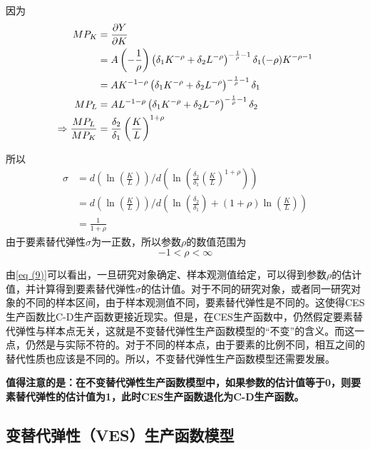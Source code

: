 	因为
	\begin{equation}
		\begin{aligned}
			M P_{K} & = \frac{\partial Y}{\partial K} \\
			& = A\left(-\frac{1}{\rho}\right)\left(\delta_{1} K^{-\rho}+\delta_{2} L^{-\rho}\right)^{-\frac{1}{\rho}-1} \delta_{1}(-\rho) K^{-\rho-1} \\
			& = A K^{-1-\rho}\left(\delta_{1} K^{-\rho}+\delta_{2} L^{-\rho}\right)^{-\frac{1}{\rho}-1} \delta_{1} \\
			M P_{L} & = A L^{-1-\rho}\left(\delta_{1} K^{-\rho}+\delta_{2} L^{-\rho}\right)^{-\frac{1}{\rho}-1} \delta_{2} \\
			\Rightarrow \frac{M P_{L}}{M P_{K}} & = \frac{\delta_{2}}{\delta_{1}}\left(\frac{K}{L}\right)^{1+\rho} \notag
		\end{aligned}
	\end{equation}
	
	所以
	\begin{equation}
		\begin{aligned}
			\sigma & = d\left(\ln \left(\frac{K}{L}\right)\right) \bigg/ d\left(\ln \left(\frac{\delta_{2}}{\delta_{1}}\left(\frac{K}{L}\right)^{1+\rho}\right)\right) \\
			& = d\left(\ln \left(\frac{K}{L}\right)\right) \bigg/ d\left(\ln \left(\frac{\delta_{2}}{\delta_{1}}\right)+(1+\rho) \ln \left(\frac{K}{L}\right)\right) \\
			& = \frac{1}{1+\rho} \label{eq (9)}
		\end{aligned}
	\end{equation}
	由于要素替代弹性$ \sigma $为一正数，所以参数$ \rho $的数值范围为
	$$ -1<\rho<\infty $$
		
	由\eqref{eq (9)}可以看出，一旦研究对象确定、样本观测值给定，可以得到参数$ \rho $的估计值，并计算得到要素替代弹性$ \sigma $的估计值。对于不同的研究对象，或者同一研究对象的不同的样本区间，由于样本观测值不同，要素替代弹性是不同的。这使得CES生产函数比C-D生产函数更接近现实。但是，在CES生产函数中，仍然假定要素替代弹性与样本点无关，这就是不变替代弹性生产函数模型的“不变”的含义。而这一点，仍然是与实际不符的。对于不同的样本点，由于要素的比例不同，相互之间的替代性质也应该是不同的。所以，不变替代弹性生产函数模型还需要发展。
		
	\textbf{值得注意的是：在不变替代弹性生产函数模型中，如果参数\bm{$ \rho $}的估计值等于0，则要素替代弹性\bm{$ \sigma $}的估计值为1，此时CES生产函数退化为C-D生产函数。}
		
\subsection{变替代弹性（VES）生产函数模型}
		
